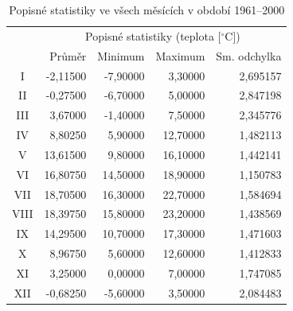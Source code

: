 \documentclass{article}
\newcommand{\Celsius}{$^\circ$C}
\begin{document}
  \begin{table}[ht]\centering \renewcommand{\arraystretch}{1.4}
 	\caption{Popisné statistiky ve všech měsících v období 1961--2000}
 	\begin{tabular}{@{}crrrr@{}}\toprule
 		       & \multicolumn{4}{c}{Popisné statistiky (teplota [\Celsius])} \\ 
 		       & Průměr   & Minimum  & Maximum  & Sm. odchylka \\ \midrule
 		  I    & -2,11500 & -7,90000 & 3,30000  & 2,695157     \\ %
 		  II   & -0,27500 & -6,70000 & 5,00000  & 2,847198     \\ %
 		  III  & 3,67000  & -1,40000 & 7,50000  & 2,345776     \\ %
 		  IV   & 8,80250  & 5,90000  & 12,70000 & 1,482113     \\ %
 		  V    & 13,61500 & 9,80000  & 16,10000 & 1,442141     \\ %
 		  VI   & 16,80750 & 14,50000 & 18,90000 & 1,150783     \\ %
 		  VII  & 18,70500 & 16,30000 & 22,70000 & 1,584694     \\ %
 		  VIII & 18,39750 & 15,80000 & 23,20000 & 1,438569     \\ %
 		  IX   & 14,29500 & 10,70000 & 17,30000 & 1,471603     \\ %
 		  X    & 8,96750  & 5,60000  & 12,60000 & 1,412833     \\ %
 		  XI   & 3,25000  & 0,00000  & 7,00000  & 1,747085     \\ %
 		  XII  & -0,68250 & -5,60000 & 3,50000  & 2,084483     \\ \bottomrule
 	\end{tabular}
 \end{table}
\end{document}
